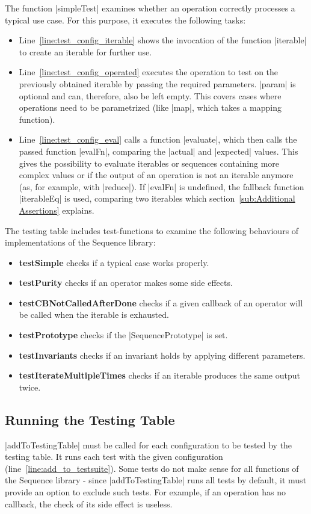 The function |simpleTest| examines whether an operation correctly processes a typical use case.
For this purpose, it executes the following tasks: 
\begin{itemize}
  \item{Line~\ref{line:test_config_iterable} shows the invocation of the
      function |iterable| to create an iterable for further use.}
  \item{Line~\ref{line:test_config_operated} executes the operation to test on
      the previously obtained iterable by passing the required parameters.
      |param| is optional and can, therefore, also be left empty. This covers
      cases where operations need to be parametrized (like |map|, which takes a
      mapping function).}
  \item{Line~\ref{line:test_config_eval} calls a function |evaluate|, which
      then calls the passed function |evalFn|, comparing the |actual| and
      |expected| values. This gives the possibility to evaluate iterables or
      sequences containing more complex values or if the output of an operation
      is not an iterable anymore (as, for example, with |reduce|). If |evalFn| is
    undefined, the fallback function |iterableEq| is used, comparing two
  iterables which section~\ref{sub:Additional Assertions} explains.} 
\end{itemize}

The testing table includes test-functions to examine the following behaviours of
implementations of the Sequence library:

\begin{itemize}
  \item{\textbf{testSimple} checks if a typical case works properly.}
  \item{\textbf{testPurity} checks if an operator makes some side effects.}
  \item{\textbf{testCBNotCalledAfterDone} checks if a given callback of an
    operator will be called when the iterable is exhausted.}
  \item{\textbf{testPrototype} checks if the |SequencePrototype| is set.}
  \item{\textbf{testInvariants} checks if an invariant holds by applying different parameters.}
  \item{\textbf{testIterateMultipleTimes} checks if an iterable produces the same output twice.}
\end{itemize}

\subsection{Running the Testing Table}
\label{sub:Running the Testing Table}
|addToTestingTable| must be called for each configuration to be tested by the
testing table. It runs each test with the given configuration
(line~\ref{line:add_to_testsuite}). Some tests do not make sense for all
functions of the Sequence library - since |addToTestingTable| runs all tests by
default, it must provide an option to exclude such tests. For
example, if an operation has no callback, the check of its side effect is
useless.

